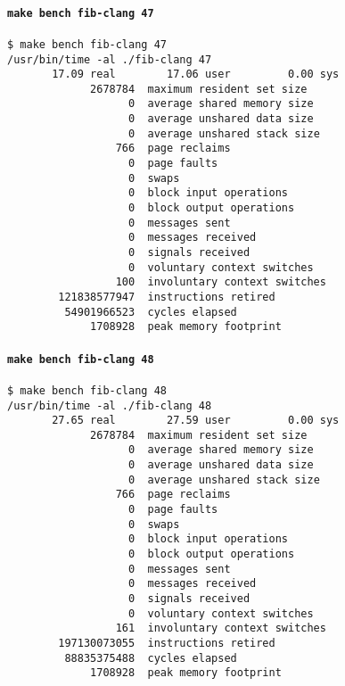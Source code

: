 \documentclass{article}
\begin{document}
\paragraph{\lstinline!make bench fib-clang 47!}
\begin{lstlisting}[language=none]
$ make bench fib-clang 47
/usr/bin/time -al ./fib-clang 47
       17.09 real        17.06 user         0.00 sys
             2678784  maximum resident set size
                   0  average shared memory size
                   0  average unshared data size
                   0  average unshared stack size
                 766  page reclaims
                   0  page faults
                   0  swaps
                   0  block input operations
                   0  block output operations
                   0  messages sent
                   0  messages received
                   0  signals received
                   0  voluntary context switches
                 100  involuntary context switches
        121838577947  instructions retired
         54901966523  cycles elapsed
             1708928  peak memory footprint
\end{lstlisting}



\paragraph{\lstinline!make bench fib-clang 48!}
\begin{lstlisting}[language=none]
$ make bench fib-clang 48
/usr/bin/time -al ./fib-clang 48
       27.65 real        27.59 user         0.00 sys
             2678784  maximum resident set size
                   0  average shared memory size
                   0  average unshared data size
                   0  average unshared stack size
                 766  page reclaims
                   0  page faults
                   0  swaps
                   0  block input operations
                   0  block output operations
                   0  messages sent
                   0  messages received
                   0  signals received
                   0  voluntary context switches
                 161  involuntary context switches
        197130073055  instructions retired
         88835375488  cycles elapsed
             1708928  peak memory footprint
\end{lstlisting}
\end{document}
